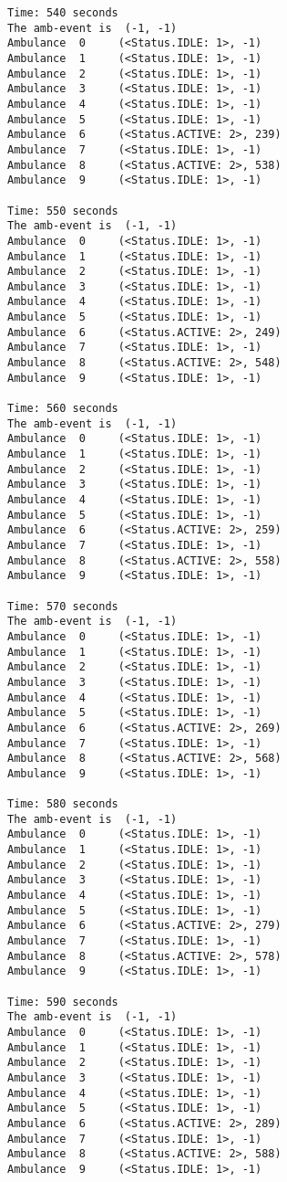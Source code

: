 \documentclass[11pt]{article}
\begin{document}
\begin{Verbatim}[commandchars=\\\{\}]
Time: 540 seconds
The amb-event is  (-1, -1)
Ambulance  0	 (<Status.IDLE: 1>, -1)
Ambulance  1	 (<Status.IDLE: 1>, -1)
Ambulance  2	 (<Status.IDLE: 1>, -1)
Ambulance  3	 (<Status.IDLE: 1>, -1)
Ambulance  4	 (<Status.IDLE: 1>, -1)
Ambulance  5	 (<Status.IDLE: 1>, -1)
Ambulance  6	 (<Status.ACTIVE: 2>, 239)
Ambulance  7	 (<Status.IDLE: 1>, -1)
Ambulance  8	 (<Status.ACTIVE: 2>, 538)
Ambulance  9	 (<Status.IDLE: 1>, -1)

Time: 550 seconds
The amb-event is  (-1, -1)
Ambulance  0	 (<Status.IDLE: 1>, -1)
Ambulance  1	 (<Status.IDLE: 1>, -1)
Ambulance  2	 (<Status.IDLE: 1>, -1)
Ambulance  3	 (<Status.IDLE: 1>, -1)
Ambulance  4	 (<Status.IDLE: 1>, -1)
Ambulance  5	 (<Status.IDLE: 1>, -1)
Ambulance  6	 (<Status.ACTIVE: 2>, 249)
Ambulance  7	 (<Status.IDLE: 1>, -1)
Ambulance  8	 (<Status.ACTIVE: 2>, 548)
Ambulance  9	 (<Status.IDLE: 1>, -1)

Time: 560 seconds
The amb-event is  (-1, -1)
Ambulance  0	 (<Status.IDLE: 1>, -1)
Ambulance  1	 (<Status.IDLE: 1>, -1)
Ambulance  2	 (<Status.IDLE: 1>, -1)
Ambulance  3	 (<Status.IDLE: 1>, -1)
Ambulance  4	 (<Status.IDLE: 1>, -1)
Ambulance  5	 (<Status.IDLE: 1>, -1)
Ambulance  6	 (<Status.ACTIVE: 2>, 259)
Ambulance  7	 (<Status.IDLE: 1>, -1)
Ambulance  8	 (<Status.ACTIVE: 2>, 558)
Ambulance  9	 (<Status.IDLE: 1>, -1)

Time: 570 seconds
The amb-event is  (-1, -1)
Ambulance  0	 (<Status.IDLE: 1>, -1)
Ambulance  1	 (<Status.IDLE: 1>, -1)
Ambulance  2	 (<Status.IDLE: 1>, -1)
Ambulance  3	 (<Status.IDLE: 1>, -1)
Ambulance  4	 (<Status.IDLE: 1>, -1)
Ambulance  5	 (<Status.IDLE: 1>, -1)
Ambulance  6	 (<Status.ACTIVE: 2>, 269)
Ambulance  7	 (<Status.IDLE: 1>, -1)
Ambulance  8	 (<Status.ACTIVE: 2>, 568)
Ambulance  9	 (<Status.IDLE: 1>, -1)

Time: 580 seconds
The amb-event is  (-1, -1)
Ambulance  0	 (<Status.IDLE: 1>, -1)
Ambulance  1	 (<Status.IDLE: 1>, -1)
Ambulance  2	 (<Status.IDLE: 1>, -1)
Ambulance  3	 (<Status.IDLE: 1>, -1)
Ambulance  4	 (<Status.IDLE: 1>, -1)
Ambulance  5	 (<Status.IDLE: 1>, -1)
Ambulance  6	 (<Status.ACTIVE: 2>, 279)
Ambulance  7	 (<Status.IDLE: 1>, -1)
Ambulance  8	 (<Status.ACTIVE: 2>, 578)
Ambulance  9	 (<Status.IDLE: 1>, -1)

Time: 590 seconds
The amb-event is  (-1, -1)
Ambulance  0	 (<Status.IDLE: 1>, -1)
Ambulance  1	 (<Status.IDLE: 1>, -1)
Ambulance  2	 (<Status.IDLE: 1>, -1)
Ambulance  3	 (<Status.IDLE: 1>, -1)
Ambulance  4	 (<Status.IDLE: 1>, -1)
Ambulance  5	 (<Status.IDLE: 1>, -1)
Ambulance  6	 (<Status.ACTIVE: 2>, 289)
Ambulance  7	 (<Status.IDLE: 1>, -1)
Ambulance  8	 (<Status.ACTIVE: 2>, 588)
Ambulance  9	 (<Status.IDLE: 1>, -1)


\end{Verbatim}
\end{document}
